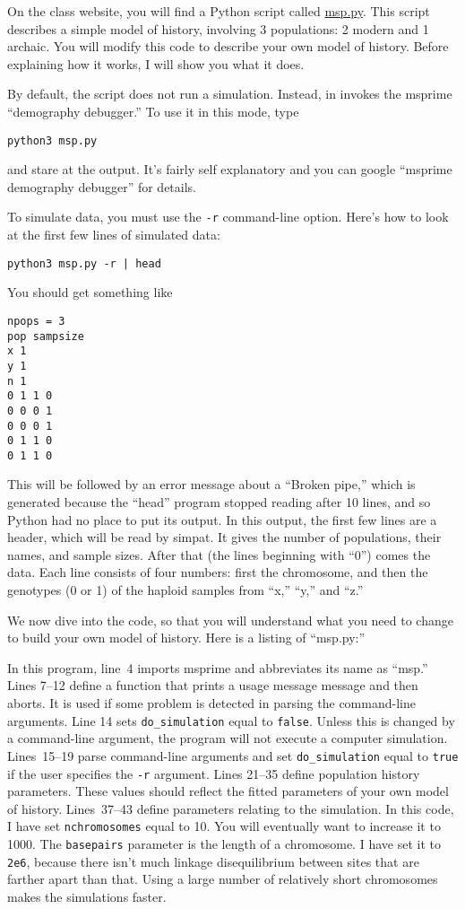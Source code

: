 \documentclass[11pt]{article}
\begin{document}
On the class website, you will find a Python script called
\href{./msp.py}{msp.py}. This script describes a simple model of
history, involving 3 populations: 2 modern and 1 archaic. You will
modify this code to describe your own model of history. Before
explaining how it works, I will show you what it does.

By default, the script does not run a simulation. Instead, in invokes
the msprime ``demography debugger.'' To use it in this mode, type
\begin{verbatim}
python3 msp.py
\end{verbatim}
and stare at the output. It's fairly self explanatory and you can
google ``msprime demography debugger'' for details.

To simulate data, you must use the \texttt{-r} command-line
option. Here's how to look at the first few lines of simulated data:
\begin{verbatim}
python3 msp.py -r | head
\end{verbatim}
You should get something like
\begin{verbatim}
npops = 3
pop sampsize
x 1
y 1
n 1
0 1 1 0 
0 0 0 1 
0 0 0 1 
0 1 1 0 
0 1 1 0 
\end{verbatim}
This will be followed by an error message about a ``Broken pipe,''
which is generated because the ``head'' program stopped reading after
10 lines, and so Python had no place to put its output. In this
output, the first few lines are a header, which will be read by
simpat. It gives the number of populations, their names, and sample
sizes. After that (the lines beginning with ``0'') comes the
data. Each line consists of four numbers: first the chromosome, and
then the genotypes (0 or 1) of the haploid samples from ``x,'' ``y,''
and ``z.''

We now dive into the code, so that you will understand what you need
to change to build your own model of history. Here is a listing of
``msp.py:''


In this program, line~4 imports msprime and abbreviates its name as
``msp.'' Lines 7--12 define a function that prints a usage message
message and then aborts. It is used if some problem is detected in
parsing the command-line arguments. Line 14 sets \verb|do_simulation|
equal to \texttt{false}. Unless this is changed by a command-line
argument, the program will not execute a computer
simulation. Lines~15--19 parse command-line arguments and set
\verb|do_simulation| equal to \texttt{true} if the user specifies the
\texttt{-r} argument.  Lines 21--35 define population history
parameters. These values should reflect the fitted parameters of your
own model of history. Lines~37--43 define parameters relating to the
simulation. In this code, I have set \texttt{nchromosomes} equal to
10. You will eventually want to increase it to 1000. The
\texttt{basepairs} parameter is the length of a chromosome. I have set
it to \texttt{2e6}, because there isn't much linkage disequilibrium
between sites that are farther apart than that. Using a large number
of relatively short chromosomes makes the simulations faster.
\end{document}
